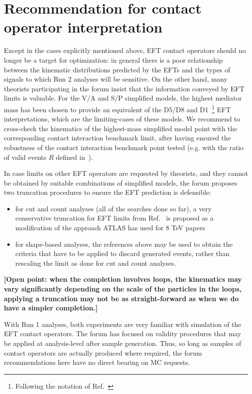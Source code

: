 \documentclass[a4,debug,notitlepage,nobib]{tufte-handout}
\begin{document}
\section{Recommendation for contact operator interpretation}
\label{sec:eft}

Except in the cases explicitly mentioned above, EFT contact operators
should no longer be a target for optimization: in general there is a
poor relationship between the kinematic distributions predicted by the
EFTs and the types of signals to which Run 2 analyses will be
sensitive. On the other hand, many theorists participating in the
forum insist that the information conveyed by EFT limits is
valuable. %
For the V/A and S/P simplified models, the highest mediator mass has
been chosen to provide an equivalent of the D5/D8 and D1~\footnote{Following 
the notation of Ref.~\cite{Goodman:2010ku}} EFT interpretations, 
which are the limiting-cases of these models. 
We recommend to cross-check the kinematics of the highest-mass simplified model point 
with the corresponding contact interaction benchmark limit, after having ensured 
the robustness of the contact interaction benchmark point tested (e.g. with the ratio 
of valid events $R$ defined in~\cite{Aad:2015zva}). 

In case limits on other EFT operators are requested by theorists, and they
cannot be obtained by suitable combinations of simplified models, the
forum proposes two truncation procedures to ensure the EFT prediction
is defensible:

\begin{itemize}
\item for cut and count analyses (all of the searches done so far), a very conservative truncation for EFT 
limits from Ref.~\cite{Racco:2015dxa} is proposed as a modification of the approach 
ATLAS has used for 8 TeV papers~\cite{Aad:2015zva}
\item for shape-based analyses, the references above may be used to obtain the criteria that 
have to be applied to discard generated events, rather than rescaling the limit as done
for cut and count analyses. 
\end{itemize}

\textbf{[Open point: when the completion involves loops, 
the kinematics may vary significantly depending on the scale of the particles in 
the loops, applying a truncation may not be as straight-forward as when we do have a simpler completion.]}

With Run 1 analyses, both experiments are very familiar with
simulation of the EFT contact operators. The forum has focused on
validity procedures that may be applied at analysis-level after sample
generation. Thus, so long as samples of contact operators are actually
produced where required, the forum recommendations here have no direct
bearing on MC requests.





\end{document}
